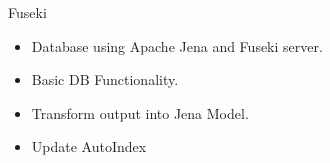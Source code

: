 \begin{frame}{Fuseki}
	\begin{itemize}
		\item Database using Apache Jena and Fuseki server.
		
		\item Basic DB Functionality.
		
		\item Transform output into Jena Model.
		
		\item Update AutoIndex
	\end{itemize}
\end{frame}